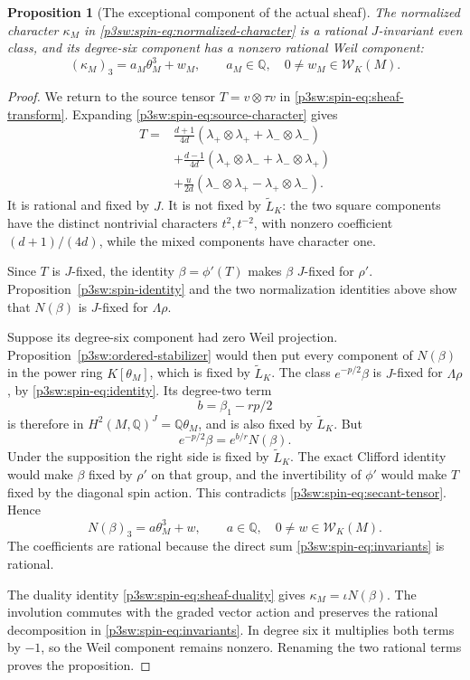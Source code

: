 \documentclass[11pt]{article}
\newcommand{\Q}{\mathbb Q}
\newtheorem{proposition}[theorem]{Proposition}
\numberwithin{equation}{section}
\begin{document}
\begin{proposition}[The exceptional component of the actual sheaf]
\label{p3sw:exceptional-character}
The normalized character \(\kappa_M\) in
\eqref{p3sw:spin-eq:normalized-character} is a rational
\(J\)-invariant even class, and its degree-six
component has a nonzero rational Weil component:
\[
 (\kappa_M)_3=a_M\theta_M^3+w_M,\qquad
 a_M\in\Q,\quad 0\ne w_M\in\mathcal W_K(M).
\]
\end{proposition}

\begin{proof}
We return to the source tensor \(T=v\otimes\tau v\) in
\eqref{p3sw:spin-eq:sheaf-transform}.  Expanding
\eqref{p3sw:spin-eq:source-character} gives
\begin{equation}
\label{p3sw:spin-eq:secant-tensor}
 \begin{split}
 T={}&
 \frac{d+1}{4d}(\lambda_+\otimes\lambda_+
                         +\lambda_-\otimes\lambda_-)\\
 &+\frac{d-1}{4d}(\lambda_+\otimes\lambda_-
                         +\lambda_-\otimes\lambda_+)\\
 &+\frac{u}{2d}(\lambda_-\otimes\lambda_+
                         -\lambda_+\otimes\lambda_-).
 \end{split}
\end{equation}
It is rational and fixed by \(J\).  It is not fixed by
\(\widetilde L_K\): the two square components have the distinct
nontrivial characters \(t^2,t^{-2}\), with nonzero coefficient
\((d+1)/(4d)\), while the mixed components have character one.

Since \(T\) is \(J\)-fixed, the identity \(\beta=\phi'(T)\) makes
\(\beta\) \(J\)-fixed for \(\rho'\).
Proposition~\ref{p3sw:spin-identity} and the two normalization
identities above show that \(N(\beta)\) is \(J\)-fixed for
\(\Lambda\rho\).

Suppose its degree-six component had zero Weil projection.
Proposition~\ref{p3sw:ordered-stabilizer} would then put every
component of \(N(\beta)\) in the power ring \(K[\theta_M]\), which
is fixed by \(\widetilde L_K\).  The class \(e^{-p/2}\beta\) is
\(J\)-fixed for \(\Lambda\rho\), by
\eqref{p3sw:spin-eq:identity}.  Its degree-two term
\[
 b=\beta_1-rp/2
\]
is therefore in \(H^2(M,\Q)^J=\Q\theta_M\), and is also fixed by
\(\widetilde L_K\).  But
\[
 e^{-p/2}\beta=e^{b/r}N(\beta).
\]
Under the supposition the right side is fixed by \(\widetilde L_K\).
The exact Clifford identity would make \(\beta\) fixed by \(\rho'\)
on that group, and the invertibility of \(\phi'\) would make \(T\)
fixed by the diagonal spin action.  This contradicts
\eqref{p3sw:spin-eq:secant-tensor}.  Hence
\[
 N(\beta)_3=a\theta_M^3+w,\qquad
 a\in\Q,\quad 0\ne w\in\mathcal W_K(M).
\]
The coefficients are rational because the direct sum
\eqref{p3sw:spin-eq:invariants} is rational.

The duality identity \eqref{p3sw:spin-eq:sheaf-duality} gives
\(\kappa_M=\iota N(\beta)\).
The involution commutes with the graded vector action and preserves
the rational decomposition in
\eqref{p3sw:spin-eq:invariants}.  In degree six it multiplies both
terms by \(-1\), so the Weil component remains nonzero.  Renaming
the two rational terms proves the proposition.
\end{proof}
\end{document}
